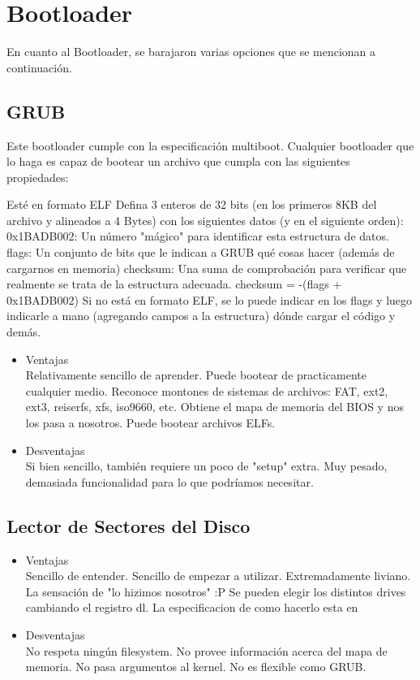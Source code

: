 \documentclass[a4paper,10pt]{article}
\begin{document}
\newpage
\section{Bootloader}
En cuanto al Bootloader, se barajaron varias opciones que se mencionan a continuación.

\subsection{GRUB}
Este bootloader cumple con la especificación multiboot. Cualquier bootloader que lo haga es capaz de bootear un archivo que cumpla con las siguientes propiedades:

Esté en formato ELF
Defina 3 enteros de 32 bits (en los primeros 8KB del archivo y alineados a 4 Bytes) con los siguientes datos (y en el siguiente orden):
0x1BADB002: Un número "mágico" para identificar esta estructura de datos.
flags: Un conjunto de bits que le indican a GRUB qué cosas hacer (además de cargarnos en memoria)
checksum: Una suma de comprobación para verificar que realmente se trata de la estructura adecuada. checksum = -(flags + 0x1BADB002)
Si no está en formato ELF, se lo puede indicar en los flags y luego indicarle a mano (agregando campos a la estructura) dónde cargar el código y demás.

\begin{itemize}
\item Ventajas
\\
Relativamente sencillo de aprender.
Puede bootear de practicamente cualquier medio.
Reconoce montones de sistemas de archivos: FAT, ext2, ext3, reiserfs, xfs, iso9660, etc.
Obtiene el mapa de memoria del BIOS y nos los pasa a nosotros.
Puede bootear archivos ELFs.

\item Desventajas
\\
Si bien sencillo, también requiere un poco de "setup" extra.
Muy pesado, demasiada funcionalidad para lo que podríamos necesitar.

\end{itemize}


\subsection{Lector de Sectores del Disco}
\begin{itemize}
\item Ventajas
\\
Sencillo de entender.
Sencillo de empezar a utilizar.
Extremadamente liviano.
La sensación de "lo hizimos nosotros" :P
Se pueden elegir los distintos drives cambiando el registro dl. La especificacion de como hacerlo esta en 

\item Desventajas
\\
No respeta ningún filesystem.
No provee información acerca del mapa de memoria.
No pasa argumentos al kernel.
No es flexible como GRUB.


\end{itemize}
\end{document}
